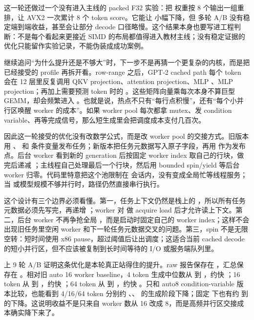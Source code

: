 这一轮还做过一个没有进入主线的 packed F32  实验：把  权重按 8 个输出一组重排，让 AVX2 一次累计 8 个 token score。它能让  小幅下降，但  多轮 A/B 没有稳定端到端收益，甚至会让部分 decode 口径略慢。这个结果本身也要写进工程判断：不是每个看起来更接近 SIMD 的布局都值得进入教材主线；没有稳定证据的优化只能留作实验记录，不能伪装成成功案例。

继续追问“为什么提升还是不够大”时，下一步不是再猜一个更复杂的内核，而是把已经接受的 profile 再拆开看。row-range 之后，GPT-2 cached path 每个 token 会在 12 层里反复调用 QKV projection、attention projection、MLP 、MLP projection；再加上需要预测 token 时的 。这些矩阵向量乘每次本身不算巨型 GEMM，却会频繁进入 。也就是说，热点不只有“每行点积慢”，还有“每个小并行区唤醒 worker 的成本”。如果 worker pool 每次都拿 mutex、发 condition variable、再等完成信号，那么短生成里会把调度成本支付几百次。

因此这一轮接受的优化没有改数学公式，而是改 worker pool 的交接方式。旧版本用 、 和  条件变量发布任务；新版本把任务元数据写入原子字段，再用  作为发布点。后台 worker 看到新的 generation 后按固定 worker index 取自己的行块，做完后递减 ；主线程自己处理最后一个行块，然后用 bounded spin/yield 等后台 worker 归零。代码里特意把这个池限制在  会话内，没有变成全局忙等线程服务；当  或模型规模不够并行时，路径仍然直接串行执行。

这个设计有三个边界必须看懂。第一，任务上下文仍然是栈上的 ，所以所有任务元数据必须先写完，再递增 ；worker 对  做 acquire load 后才允许读上下文。第二，后台 worker 不再争抢全局 ，而是启动时固定自己的 worker index；这样不会出现旧任务里空闲 worker 和下一轮任务元数据交叉的问题。第三，spin 不是无限空转：短时间使用 x86 pause，超过阈值后让出调度；这适合当前 cached decode 的短小并行区，但不应该被复制到长时间等待的 I/O 或服务端队列里。

 上 9 轮 A/B 证明这条优化是本轮真正站得住的提升。raw 报告保存在 ，汇总保存在 。相对旧 auto 16 worker baseline，4 token 生成中位数从  到 ，约快 ；16 token 从  到 ，约快 ；64 token 从  到 ，约快 。只和 auto8 condition-variable 版本比较，也能看到 4/16/64 token 分别约 、、 的生成阶段下降；固定  下也有约  到  的下降。这说明收益不是只来自 worker 数从 16 改成 8，而是高频并行区交接成本确实降下来了。

